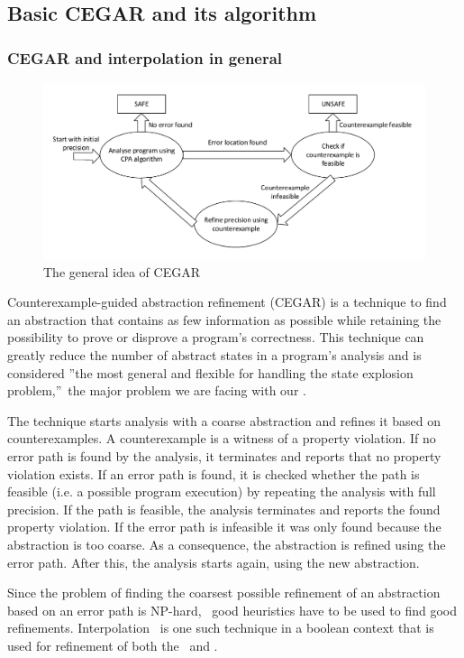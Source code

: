 \subsection{Basic CEGAR and its algorithm}
\subsubsection{CEGAR and interpolation in general}
\begin{figure}[t]
\includegraphics[width=\linewidth]{theoreticalBackground/CegarPrinciple}
\caption{The general idea of CEGAR}
\label{fig:cegarPrinciple}
\end{figure}
Counterexample-guided abstraction refinement (CEGAR) \cite{Clarke2003} is a technique to find an abstraction that contains as few information as possible while retaining the possibility to prove or disprove a program's correctness.
This technique can greatly reduce the number of abstract states in a program's analysis and is considered ''the most general and flexible for handling the state explosion problem,''\cite{Clarke2003}\ the major problem we are facing with our \symbolicExecutionCPA.

The technique starts analysis with a coarse abstraction and refines it based on counterexamples. A counterexample is a witness of a property violation.\cite{Beyer2013}
If no error path is found by the analysis, it terminates and reports that no property violation exists.
If an error path is found, it is checked whether the path is feasible (i.e. a possible program execution) by repeating the analysis with full precision.
If the path is feasible, the analysis terminates and reports the found property violation.
If the error path is infeasible it was only found because the abstraction is too coarse. As a consequence, the abstraction is refined using the error path.
After this, the analysis starts again, using the new abstraction.

Since the problem of finding the coarsest possible refinement of an abstraction based on an error path is NP-hard, \cite{Clarke2003}\ good heuristics have to be used to find good refinements.
Interpolation \cite{Henzinger2004}\ is one such technique in a boolean context that is used for refinement of both the \predicateCPA\ and .

